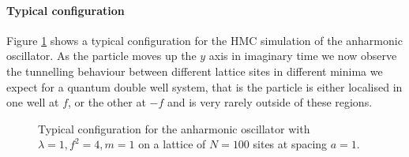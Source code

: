 \documentclass[12pt]{article}
\begin{document}
            \paragraph{Typical configuration}
                Figure \ref{fig:TypicalAnharmonicTrajectory} shows a typical configuration for the HMC simulation of the anharmonic oscillator. As the particle moves up the $y$ axis in imaginary time we now observe the tunnelling behaviour between different lattice sites in different minima we expect for a quantum double well system, that is the particle is either localised in one well at $f$, or the other at $-f$ and is very rarely outside of these regions.
                \begin{figure}
                    \centering
                    \caption{Typical configuration for the anharmonic oscillator with $\lambda = 1, f^2 = 4, m = 1$ on a lattice of $N=100$ sites at spacing $a = 1$.}
                    \label{fig:TypicalAnharmonicTrajectory}
                \end{figure}
\end{document}
